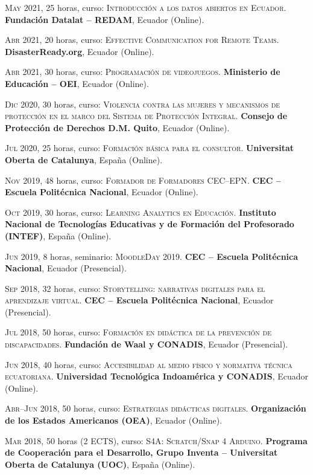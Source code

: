 \documentclass[a4paper]{article}
\begin{document}
\textsc{May} 2021, 25 horas, curso: \textsc{Introducción a los datos abiertos en Ecuador}.
\textbf{Fundación Datalat -- REDAM}, Ecuador (Online).

\textsc{Abr} 2021, 20 horas, curso: \textsc{Effective Communication for Remote Teams}.
\textbf{DisasterReady.org}, Ecuador (Online).

\textsc{Abr} 2021, 30 horas, curso: \textsc{Programación de videojuegos}.
\textbf{Ministerio de Educación -- OEI}, Ecuador (Online).

\textsc{Dic} 2020, 30 horas, curso: \textsc{Violencia contra las mujeres y mecanismos de protección en el marco del Sistema de Protección Integral}.
\textbf{Consejo de Protección de Derechos D.M. Quito}, Ecuador (Online).

\textsc{Jul} 2020, 25 horas, curso: \textsc{Formación básica para el consultor}.
\textbf{Universitat Oberta de Catalunya}, España (Online).

\textsc{Nov} 2019, 48 horas, curso: \textsc{Formador de Formadores CEC--EPN}.
\textbf{CEC -- Escuela Politécnica Nacional}, Ecuador (Online).

\textsc{Oct} 2019, 30 horas, curso: \textsc{Learning Analytics en Educación}.
\textbf{Instituto Nacional de Tecnologías Educativas y de Formación del Profesorado (INTEF)}, España (Online).

\textsc{Jun} 2019, 8 horas, seminario: \textsc{MoodleDay 2019}.
\textbf{CEC -- Escuela Politécnica Nacional}, Ecuador (Presencial).

\textsc{Sep} 2018, 32 horas, curso: \textsc{Storytelling: narrativas digitales para el aprendizaje virtual}.
\textbf{CEC -- Escuela Politécnica Nacional}, Ecuador (Presencial).

\textsc{Jul} 2018, 50 horas, curso: \textsc{Formación en didáctica de la prevención de discapacidades}.
\textbf{Fundación de Waal y CONADIS}, Ecuador (Presencial).

\textsc{Jun} 2018, 40 horas, curso: \textsc{Accesibilidad al medio físico y normativa técnica ecuatoriana}.
\textbf{Universidad Tecnológica Indoamérica y CONADIS}, Ecuador (Online).

\textsc{Abr--Jun} 2018, 50 horas, curso: \textsc{Estrategias didácticas digitales}.
\textbf{Organización de los Estados Americanos (OEA)}, Ecuador (Online).

\textsc{Mar} 2018, 50 horas (2 ECTS), curso: \textsc{S4A: Scratch/Snap 4 Arduino}.
\textbf{Programa de Cooperación para el Desarrollo, Grupo Inventa -- Universitat Oberta de Catalunya (UOC)}, España (Online).
\end{document}

